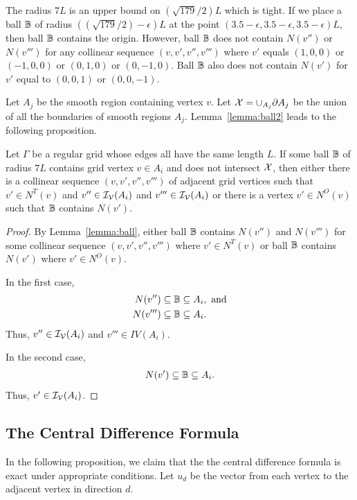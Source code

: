 The radius $7L$ is an upper bound on $(\sqrt{179}/2)L$ which is tight.
If we place a ball $\mathbb{B}$ of radius $((\sqrt{179}/2)-\epsilon)L$
at the point $(3.5-\epsilon,3.5-\epsilon,3.5-\epsilon)L$,
then ball $\mathbb{B}$ contains the origin.
However, ball $\mathbb{B}$ does not contain $N(v'')$ or $N(v''')$
for any collinear sequence $(v,v',v'',v''')$ where $v'$
equals $(1,0,0)$ or $(-1,0,0)$ or $(0,1,0)$ or $(0,-1,0)$.
Ball $\mathbb{B}$ also does not contain $N(v')$
for $v'$ equal to $(0,0,1)$ or $(0,0,-1)$.

Let $A_j$ be the smooth region containing vertex $v$.
Let $\mathcal{X} = \cup_{A_j} \partial A_j$
be the union of all the boundaries of smooth regions $A_j$.
Lemma~\ref{lemma:ball2} leads to the following proposition.
\begin{proposition}
Let $\Gamma$ be a regular grid whose edges all have the same length $L$.
If some ball $\mathbb{B}$ of radius $7L$ contains grid vertex $v \in A_i$
and does not intersect $\mathcal{X}$,
then either there is a collinear sequence $(v,v',v'',v''')$ 
of adjacent grid vertices 
such that $v' \in N^T(v)$ and $v'' \in \mathcal{I_V}(A_i)$ and $v''' \in \mathcal{I_V}(A_i)$
or there is a vertex $v' \in N^O(v)$ such that $\mathbb{B}$ contains $N(v')$.
\label{prop:IV:b}
\end{proposition}

\begin{proof}
By Lemma~\ref{lemma:ball}, either ball $\mathbb{B}$ contains $N(v'')$ and $N(v''')$
for some collinear sequence $(v,v',v'',v''')$ where $v' \in N^T(v)$
or ball $\mathbb{B}$ contains $N(v')$ where $v' \in N^O(v)$.

In the first case,
\begin{align*}
N(v'') & \subseteq \mathbb{B} \subseteq A_i, \mbox{  and} \\
N(v''') & \subseteq \mathbb{B} \subseteq A_i.
\end{align*}
Thus, $v'' \in \mathcal{I_V}(A_i)$ and $v''' \in IV(A_i)$.

In the second case,
\begin{align*}
N(v') \subseteq \mathbb{B} \subseteq A_i.
\end{align*}
Thus, $v' \in \mathcal{I_V}(A_i)$.
\end{proof}


\subsection{The Central Difference Formula}

In the following proposition,
we claim that the the central difference formula is exact
under appropriate conditions.
Let $u_d$ be the vector from each vertex 
to the adjacent vertex in direction $d$.

